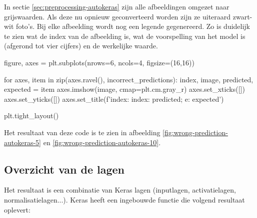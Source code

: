 In sectie \ref{sec:preprocessing-autokeras} zijn alle afbeeldingen omgezet naar grijswaarden. Als deze nu opnieuw geconverteerd worden zijn ze uiteraard zwart-wit foto's. Bij elke afbeelding wordt nog een legende gegenereerd. Zo is duidelijk te zien wat de index van de afbeelding is, wat de voorspelling van het model is (afgerond tot vier cijfers) en de werkelijke waarde.

\bigskip

\begin{python}

figure, axes = plt.subplots(nrows=6, ncols=4, figsize=(16,16))

for axes, item in zip(axes.ravel(), incorrect_predictions):
    index, image, predicted, expected = item
    axes.imshow(image, cmap=plt.cm.gray_r)
    axes.set_xticks([])
    axes.set_yticks([])
    axes.set_title(f'index: {index}\np: {predicted}; e: {expected}')
    
plt.tight_layout()
\end{python}

Het resultaat van deze code is te zien in afbeelding \ref{fig:wrong-prediction-autokeras-5} en \ref{fig:wrong-prediction-autokeras-10}.

\subsection{Overzicht van de lagen}
\label{subsec:model-overview}

Het resultaat is een combinatie van Keras lagen (inputlagen, activatielagen, normalisatielagen...). Keras heeft een ingebouwde functie  die volgend resultaat oplevert:

\bigskip

